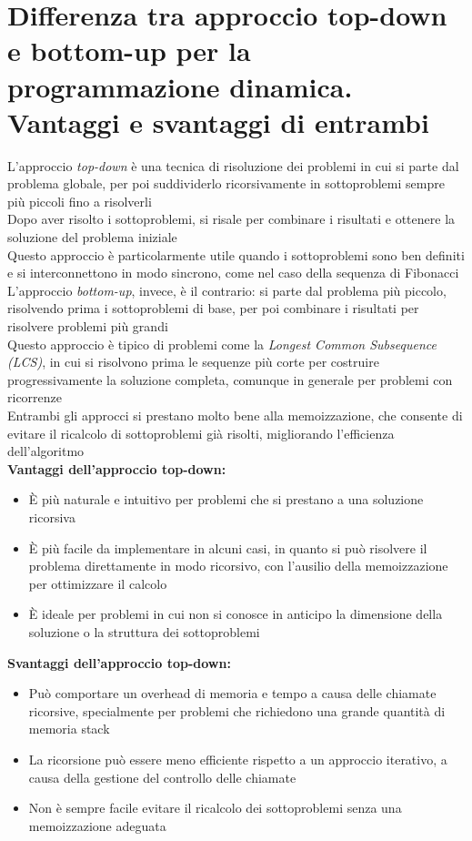 \documentclass[12pt,oneside,a4paper]{article}
\begin{document}
\section{Differenza tra approccio top-down e bottom-up per la programmazione dinamica. Vantaggi e svantaggi di entrambi}
L'approccio \textit{top-down} è una tecnica di risoluzione dei problemi in cui si parte dal problema globale, per poi suddividerlo ricorsivamente in sottoproblemi sempre più piccoli fino a risolverli\\
Dopo aver risolto i sottoproblemi, si risale per combinare i risultati e ottenere la soluzione del problema iniziale\\
Questo approccio è particolarmente utile quando i sottoproblemi sono ben definiti e si interconnettono in modo sincrono, come nel caso della sequenza di Fibonacci\\
L'approccio \textit{bottom-up}, invece, è il contrario: si parte dal problema più piccolo, risolvendo prima i sottoproblemi di base, per poi combinare i risultati per risolvere problemi più grandi\\
Questo approccio è tipico di problemi come la \textit{Longest Common Subsequence (LCS)}, in cui si risolvono prima le sequenze più corte per costruire progressivamente la soluzione completa, comunque in generale per problemi con ricorrenze\\
Entrambi gli approcci si prestano molto bene alla memoizzazione, che consente di evitare il ricalcolo di sottoproblemi già risolti, migliorando l'efficienza dell'algoritmo\\
\textbf{Vantaggi dell'approccio top-down:}
\begin{itemize}
\item È più naturale e intuitivo per problemi che si prestano a una soluzione ricorsiva
\item È più facile da implementare in alcuni casi, in quanto si può risolvere il problema direttamente in modo ricorsivo, con l'ausilio della memoizzazione per ottimizzare il calcolo
\item È ideale per problemi in cui non si conosce in anticipo la dimensione della soluzione o la struttura dei sottoproblemi
\end{itemize}
\textbf{Svantaggi dell'approccio top-down:}
\begin{itemize}
\item Può comportare un overhead di memoria e tempo a causa delle chiamate ricorsive, specialmente per problemi che richiedono una grande quantità di memoria stack
\item La ricorsione può essere meno efficiente rispetto a un approccio iterativo, a causa della gestione del controllo delle chiamate
\item Non è sempre facile evitare il ricalcolo dei sottoproblemi senza una memoizzazione adeguata
\end{itemize}
\end{document}
